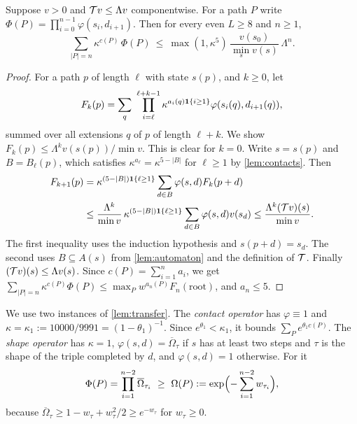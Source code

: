 \begin{lemma}\label{lem:transfer}
Suppose $v>0$ and $\mathcal T v\le\Lambda v$ componentwise. For a path $P$ write $\Phi(P)=\prod_{i=0}^{n-1}\varphi(s_i,d_{i+1})$. Then for every even $L\ge8$ and $n\ge1$,
\[
 \sum_{|P|=n}\kappa^{c(P)}\,\Phi(P)\ \le\ \max(1,\kappa^5)\,\frac{v(s_0)}{\min_sv(s)}\,\Lambda^n .
\]
\end{lemma}

\begin{proof}
For a path $p$ of length $\ell$ with state $s(p)$, and $k\ge0$, let
\[
 F_k(p)=\sum_q\ \prod_{i=\ell}^{\ell+k-1}\kappa^{a_i(q)\one\{i\ge1\}}\varphi(s_i(q),d_{i+1}(q)),
\]
summed over all extensions $q$ of $p$ of length $\ell+k$. We show $F_k(p)\le\Lambda^kv(s(p))/\min v$. This is clear for $k=0$. Write $s=s(p)$ and $B=B_\ell(p)$, which satisfies $\kappa^{a_\ell}=\kappa^{5-|B|}$ for $\ell\ge1$ by \cref{lem:contacts}. Then
\[
\begin{aligned}
 F_{k+1}(p)&=\kappa^{(5-|B|)\mathbf 1\{\ell\ge1\}}\sum_{d\in B}\varphi(s,d)F_k(p+d)\\
 &\le\frac{\Lambda^k}{\min v}\,\kappa^{(5-|B|)\mathbf 1\{\ell\ge1\}}\sum_{d\in B}\varphi(s,d)v(s_d)
 \le\frac{\Lambda^k(\mathcal T v)(s)}{\min v}.
\end{aligned}
\]
The first inequality uses the induction hypothesis and $s(p+d)=s_d$. The second uses $B\subseteq A(s)$ from \cref{lem:automaton} and the definition of $\mathcal T$. Finally $(\mathcal T v)(s)\le\Lambda v(s)$. Since $c(P)=\sum_{i=1}^na_i$, we get $\sum_{|P|=n}\kappa^{c(P)}\Phi(P)\le\max_Pw^{a_n(P)}F_n(\text{root})$, and $a_n\le5$.
\end{proof}

We use two instances of \cref{lem:transfer}. The \emph{contact operator} has $\varphi\equiv1$ and $\kappa=\kappa_1:=10000/9991=(1-\theta_1)^{-1}$. Since $e^{\theta_1}<\kappa_1$, it bounds $\sum_Pe^{\theta_1c(P)}$. The \emph{shape operator} has $\kappa=1$, $\varphi(s,d)=\overline\Omega_\tau$ if $s$ has at least two steps and $\tau$ is the shape of the triple completed by $d$, and $\varphi(s,d)=1$ otherwise. For it
\[
 \Phi(P)=\prod_{i=1}^{n-2}\overline\Omega_{\tau_i}\ \ge\ \Omega(P):=\exp\Bigl(-\sum_{i=1}^{n-2}w_{\tau_i}\Bigr),
\]
because $\overline\Omega_\tau\ge1-w_\tau+w_\tau^2/2\ge e^{-w_\tau}$ for $w_\tau\ge0$.

